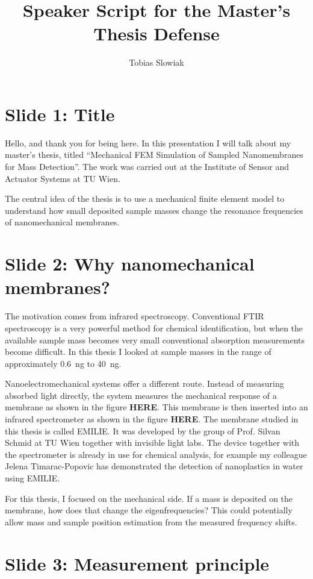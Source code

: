 \documentclass[11pt,a4paper]{article}
\title{Speaker Script for the Master's Thesis Defense}
\author{Tobias Slowiak}
\date{}
\begin{document}
\maketitle

\section*{Slide 1: Title}

Hello, and thank you for being here. In this presentation I will talk about my master's thesis, titled ``Mechanical FEM Simulation of Sampled Nanomembranes for Mass Detection''. The work was carried out at the Institute of Sensor and Actuator Systems at TU Wien.

The central idea of the thesis is to use a mechanical finite element model to understand how small deposited sample masses change the resonance frequencies of nanomechanical membranes.

\section*{Slide 2: Why nanomechanical membranes?}

The motivation comes from infrared spectroscopy. Conventional FTIR spectroscopy is a very powerful method for chemical identification, but when the available sample mass becomes very small conventional absorption measurements become difficult. In this thesis I looked at sample masses in the range of approximately \SI{0.6}{\nano\gram} to \SI{40}{\nano\gram}.

Nanoelectromechanical systems offer a different route. Instead of measuring absorbed light directly, the system measures the mechanical response of a membrane as shown in the figure \textbf{HERE}. This membrane is then inserted into an infrared spectrometer as shown in the figure \textbf{HERE}. The membrane studied in this thesis is called EMILIE. It was developed by the group of Prof. Silvan Schmid at TU Wien together with invisible light labs. The device together with the spectrometer is already in use for chemical analysis, for example my colleague Jelena Timarac-Popovic has demonstrated the detection of nanoplastics in water using EMILIE.

For this thesis, I focused on the mechanical side. If a mass is deposited on the membrane, how does that change the eigenfrequencies? This could potentially allow mass and sample position estimation from the measured frequency shifts.

\section*{Slide 3: Measurement principle}
\end{document}

